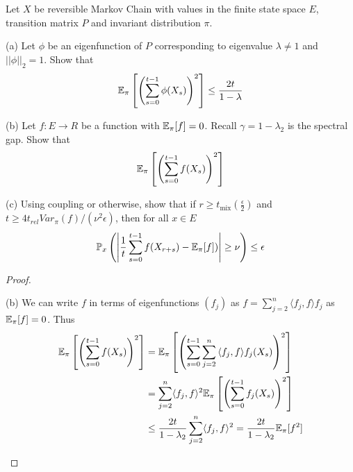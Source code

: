 \documentclass[a4paper]{article}
\renewcommand{\P}{\mathbb P}
\begin{document}
	\begin{question}[Question 7]
	Let $X$ be reversible Markov Chain with values in the finite state space $E$, transition matrix $P$ and invariant distribution $\pi$.
	\begin{description}
	\item (a) Let $\phi$ be an eigenfunction of $P$ corresponding to eigenvalue $\lambda \neq 1$ and $||\phi||_{2} = 1$. Show that
	\[ \E_{\pi}\left[ \left(\sum_{s = 0}^{t-1} \phi(X_s)\right)^2\right] \leq \frac{2t}{1-\lambda} \]
	\item (b) Let $f: E \to R$ be a function with $\E_{\pi}[f] = 0$. Recall $\gamma = 1 - \lambda_2$ is the spectral gap. Show that
	\[ \E_{\pi}\left[ \left( \sum_{s=0}^{t-1} f(X_s) \right)^2 \right] \]
	\item (c) Using coupling or otherwise, show that if $r \geq t_{\text{mix}}(\frac{\epsilon}{2})$ and $t \geq 4 t_{rel}Var_{\pi}(f)/(\nu^2\epsilon)$, then for all $x \in E$
	\[\P_x \left( \left| \frac{1}{t} \sum_{s=0}^{t-1}{f(X_{r+s}) - \E_{\pi}[f])} \right| \geq \nu \right) \leq \epsilon\]
	\end{description}
	\end{question}
	\begin{proof}
	\begin{description}
	\item (b) We can write $f$ in terms of eigenfunctions $(f_j)$ as $f = \sum_{j=2}^n{\langle f_j, f \rangle f_j}$ as $\E_{\pi}[f] = 0$. Thus
	\begin{align*}	
	\E_{\pi}\left[ \left( \sum_{s=0}^{t-1} f(X_s) \right)^2 \right] &= \E_{\pi}\left[ \left( \sum_{s=0}^{t-1}  \sum_{j=2}^n{\langle f_j, f \rangle f_j (X_s)} \right)^2 \right]\\
	&= \sum_{j=2}^n \langle f_j, f \rangle ^2 \E_{\pi}\left[ \left( \sum_{s=0}^{t-1} f_j (X_s) \right) ^2 \right]\\
	&\leq \frac{2t}{1-\lambda_2} \sum_{j=2}^n \langle f_j, f \rangle ^2 = \frac{2t}{1-\lambda_2}\E_{\pi}[f^2]
	\end{align*}
	\end{description}
	\end{proof}
	
\end{document}
